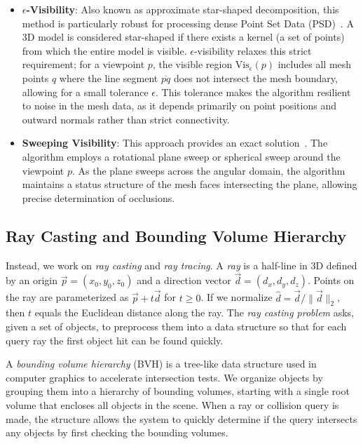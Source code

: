 \documentclass[letterpaper, 10 pt, conference]{ieeeconf}  %
\begin{document}
\begin{itemize}
    \item \textbf{$\epsilon$-Visibility}: Also known as approximate star-shaped decomposition, this method is particularly robust for processing dense Point Set Data (PSD)~\cite{PBG07_cr}. A 3D model is considered star-shaped if there exists a kernel (a set of points) from which the entire model is visible. $\epsilon$-visibility relaxes this strict requirement; for a viewpoint $p$, the visible region $\text{Vis}_\epsilon(p)$ includes all mesh points $q$ where the line segment $\overline{pq}$ does not intersect the mesh boundary, allowing for a small tolerance $\epsilon$. This tolerance makes the algorithm resilient to noise in the mesh data, as it depends primarily on point positions and outward normals rather than strict connectivity.
    
    \item \textbf{Sweeping Visibility}: This approach provides an exact solution~\cite{Yu}. The algorithm employs a rotational plane sweep or spherical sweep around the viewpoint $p$. As the plane sweeps across the angular domain, the algorithm maintains a status structure of the mesh faces intersecting the plane, allowing precise determination of occlusions.
\end{itemize}

\subsection{Ray Casting and Bounding Volume Hierarchy}

Instead, we work on \emph{ray casting} and \emph{ray tracing}.
A \emph{ray} is a half-line in 3D defined by an origin $\vec{p} = (x_0, y_0, z_0)$ and a direction vector $\vec{d} =(d_x, d_y, d_z)$. Points on the ray are parameterized as $\vec{p} + t\vec{d}$ for $t \ge 0$.
If we normalize $\hat{d} = \vec{d}/\|\vec{d}\|_2$, then $t$ equals the Euclidean distance along the ray.
The \emph{ray casting problem} asks, given a set of objects, to preprocess them into a data structure so that for each query ray the first object hit can be found quickly. 

A \emph{bounding volume hierarchy} (BVH) is a tree-like data structure used in computer graphics to accelerate intersection tests. We organize objects by grouping them into a hierarchy of bounding volumes, starting with a single root volume that encloses all objects in the scene. When a ray or collision query is made, the structure allows the system to quickly determine if the query intersects any objects by first checking the bounding volumes. 
\end{document}
